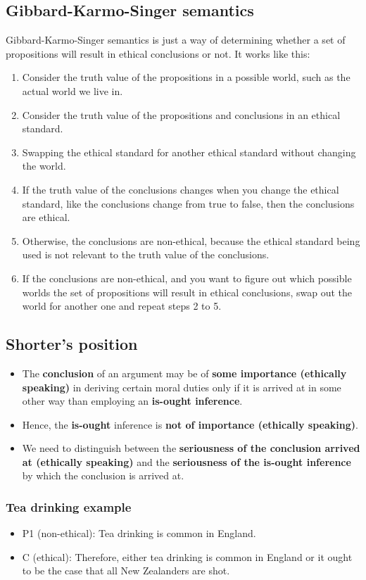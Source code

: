 \documentclass[11pt]{article}
\begin{document}
 \newpage
\subsection{Gibbard-Karmo-Singer semantics}
\label{sec:org3217756}
Gibbard-Karmo-Singer semantics is just a way of determining whether a set of propositions will result in ethical conclusions or not. It works like this:
\begin{enumerate}
\item Consider the truth value of the propositions in a possible world, such as the actual world we live in.
\item Consider the truth value of the propositions and conclusions in an ethical standard.
\item Swapping the ethical standard for another ethical standard without changing the world.
\item If the truth value of the conclusions changes when you change the ethical standard, like the conclusions change from true to false, then the conclusions are ethical.
\item Otherwise, the conclusions are non-ethical, because the ethical standard being used is not relevant to the truth value of the conclusions.
\item If the conclusions are non-ethical, and you want to figure out which possible worlds the set of propositions will result in ethical conclusions, swap out the world for another one and repeat steps 2 to 5.
\end{enumerate}
\subsection{Shorter's position}
\label{sec:orgb1136b8}
\begin{itemize}
\item The \textbf{conclusion} of an argument may be of \textbf{some importance (ethically speaking)} in deriving certain moral duties only if it is arrived at in some other way than employing an \textbf{is-ought inference}.
\item Hence, the \textbf{is-ought} inference is \textbf{not of importance (ethically speaking)}.
\item We need to distinguish between the \textbf{seriousness of the conclusion arrived at (ethically speaking)} and the \textbf{seriousness of the is-ought inference} by which the conclusion is arrived at.
\end{itemize}

 \newpage
\subsubsection{Tea drinking example}
\label{sec:orga185dea}
\begin{itemize}
\item P1 (non-ethical): Tea drinking is common in England.
\item C (ethical): Therefore, either tea drinking is common in England or it ought to be the case that all New Zealanders are shot.
\end{itemize}
\end{document}
